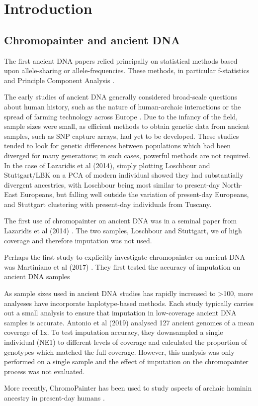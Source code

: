 \chapter{Introduction}

\section{Chromopainter and ancient DNA}

The first ancient DNA papers relied principally on statistical methods based upon allele-sharing or allele-frequencies. These methods, in particular f-statistics \cite{Green2010, Patterson2012, peter2016admixture} and Principle Component Analysis \cite{price2006principal}. 

The early studies of ancient DNA generally considered broad-scale questions about human history, such as the nature of human-archaic interactions or the spread of farming technology across Europe \cite{Lazaridis2014}. Due to the infancy of the field, sample sizes were small, as efficient methods to obtain genetic data from ancient samples, such as SNP capture arrays, had yet to be developed. These studies tended to look for genetic differences between populations which had been diverged for many generations; in such cases, powerful methods are not required. In the case of Lazaridis et al (2014), simply plotting Loschbour and Stuttgart/LBK on a PCA of modern individual showed they had substantially divergent ancestries, with Loschbour being most similar to present-day North-East Europeans, but falling well outside the variation of present-day Europeans, and Stuttgart clustering with present-day individuals from Tuscany. 

The first use of chromopainter on ancient DNA was in a seminal paper from Lazaridis et al (2014) \cite{Lazaridis2014}. The two samples, Loschbour and Stuttgart, we of high coverage and therefore imputation was not used.

Perhaps the first study to explicitly investigate chromopainter on ancient DNA was Martiniano et al (2017) \cite{Martiniano2017}. They first tested the accuracy of imputation on ancient DNA samples 

As sample sizes used in ancient DNA studies has rapidly increased to >100, more analyeses have incorporate haplotype-based methods. Each study typically carries out a small analysis to ensure that imputation in low-coverage ancient DNA samples is accurate. Antonio et al (2019) \cite{antonio2019ancient} analysed 127 ancient genomes of a mean coverage of 1x. To test imputation accuracy, they downsampled a single individual (NE1) to different levels of coverage and calculated the proportion of genotypes which matched the full coverage. However, this analysis was only performed on a single sample and the effect of imputation on the chromopainter process was not evaluated. 

More recently, ChromoPainter has been used to study aspects of archaic hominin ancestry in present-day humans \cite{JACOBS20191010, teixeira2021widespread}. 